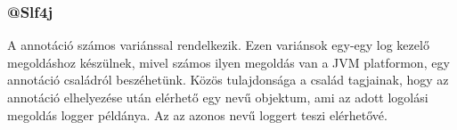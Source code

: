 \subsubsection{@Slf4j}

A  annotáció számos variánssal rendelkezik. Ezen variánsok egy-egy log kezelő megoldáshoz készülnek, mivel számos ilyen megoldás van a JVM platformon, egy annotáció családról beszéhetünk. Közös tulajdonsága a család tagjainak, hogy az annotáció elhelyezése után elérhető egy  nevű objektum, ami az adott logolási megoldás logger példánya. Az  az azonos nevű loggert teszi elérhetővé. \par




